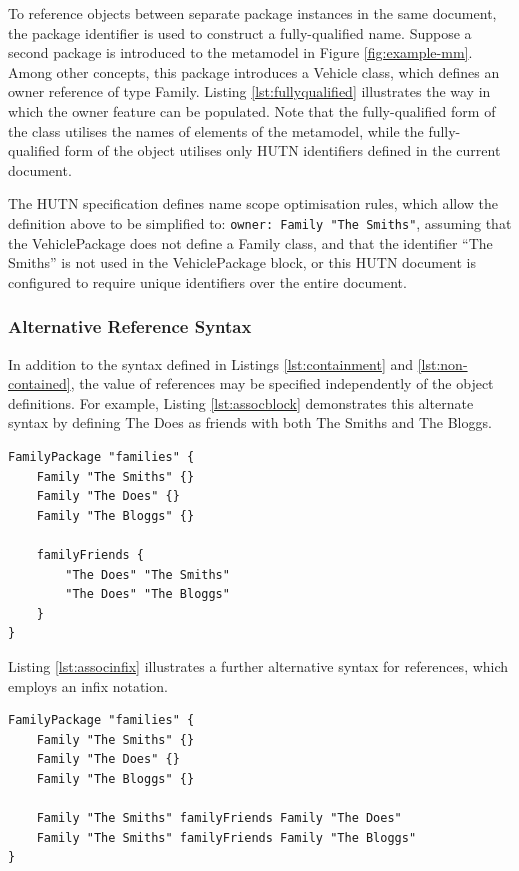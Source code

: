 To reference objects between separate package instances in the same document, the package identifier is used to construct a fully-qualified name. Suppose a second package is introduced to the metamodel in Figure \ref{fig:example-mm}. Among other concepts, this package introduces a Vehicle class, which defines an owner reference of type Family. Listing \ref{lst:fullyqualified} illustrates the way in which the owner feature can be populated. Note that the fully-qualified form of the class utilises the names of elements of the metamodel, while the fully-qualified form of the object utilises only HUTN identifiers defined in the current document.

The HUTN specification defines name scope optimisation rules, which allow the definition above to be simplified to: \texttt{owner: Family "The Smiths"}, assuming that the VehiclePackage does not define a Family class, and that the identifier ``The Smiths'' is not used in the VehiclePackage block, or this HUTN document is configured to require unique identifiers over the entire document.


\subsubsection{Alternative Reference Syntax}
In addition to the syntax defined in Listings \ref{lst:containment} and \ref{lst:non-contained}, the value of references may be specified independently of the object definitions. For example, Listing \ref{lst:assocblock} demonstrates this alternate syntax by defining The Does as friends with both The Smiths and The Bloggs.

\begin{lstlisting}[caption=Using a reference block in HUTN., label=lst:assocblock, language=HutnFamilies]
FamilyPackage "families" {
    Family "The Smiths" {}
    Family "The Does" {}
    Family "The Bloggs" {}
    
    familyFriends {
        "The Does" "The Smiths"
        "The Does" "The Bloggs"
    }
}
\end{lstlisting}

Listing \ref{lst:associnfix} illustrates a further alternative syntax for references, which employs an infix notation. 

\begin{lstlisting}[caption=Using an infix reference in HUTN., label=lst:associnfix, language=HutnFamilies]
FamilyPackage "families" {
    Family "The Smiths" {}
    Family "The Does" {}
    Family "The Bloggs" {}
    
    Family "The Smiths" familyFriends Family "The Does"
    Family "The Smiths" familyFriends Family "The Bloggs"
}
\end{lstlisting}


